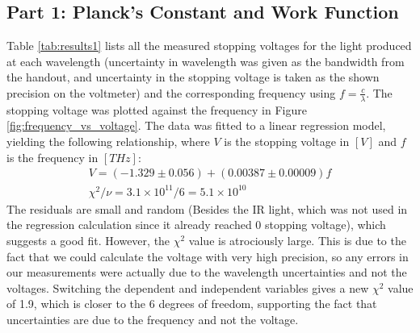 \subsection{Part 1: Planck's Constant and Work Function}
\label{sec:results1}
Table \ref{tab:results1} lists all the measured stopping voltages for the light produced at each wavelength (uncertainty in wavelength was given as the bandwidth from the handout, and uncertainty in the stopping voltage is taken as the shown precision on the voltmeter) and the corresponding frequency using $f = \frac{c}{\lambda}$. The stopping voltage was plotted against the frequency in Figure \ref{fig:frequency_vs_voltage}. The data was fitted to a linear regression model, yielding the following relationship, where $V$ is the stopping voltage in $[V]$ and $f$ is the frequency in $[THz]$:
\begin{gather}
    V = (-1.329 \pm 0.056) + (0.00387 \pm 0.00009)f \\
    \chi^2 / \nu = 3.1 \times 10^{11} / 6 = 5.1 \times 10^{10}
\end{gather}
The residuals are small and random (Besides the IR light, which was not used in the regression calculation since it already reached 0 stopping voltage), which suggests a good fit. However, the $\chi^2$ value is atrociously large. This is due to the fact that we could calculate the voltage with very high precision, so any errors in our measurements were actually due to the wavelength uncertainties and not the voltages. Switching the dependent and independent variables gives a new $\chi^2$ value of 1.9, which is closer to the 6 degrees of freedom, supporting the fact that uncertainties are due to the frequency and not the voltage.


